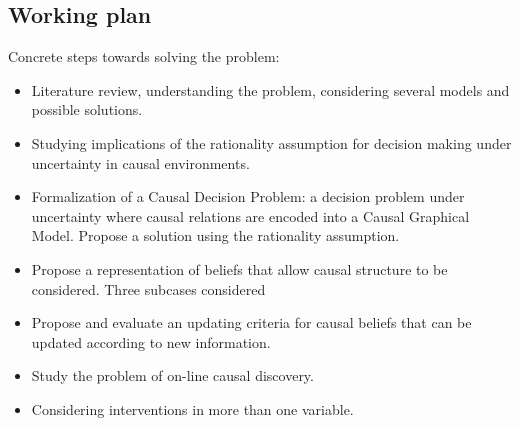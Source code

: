 \documentclass[english,letterpaper,12pt,final]{article}
\theoremstyle{definition}
\begin{document}
\subsection{Working plan}
Concrete steps towards solving the problem:
\begin{itemize}
\item Literature review, understanding the problem, considering several models and possible solutions.
\item Studying implications of the rationality assumption for decision making under uncertainty in causal environments.
\item Formalization of a Causal Decision Problem: a decision problem under uncertainty where causal relations are encoded into a Causal Graphical Model. Propose a solution using the rationality assumption.
\item Propose a representation of beliefs that allow causal structure to be considered. Three subcases considered
\item Propose and evaluate an updating criteria for causal beliefs that can be updated according to new information.
\item Study the problem of on-line causal discovery.
\item Considering interventions in more than one variable.

\end{itemize}
\end{document}
